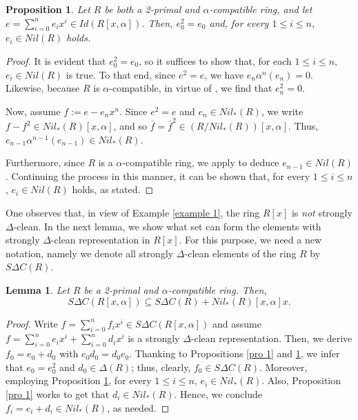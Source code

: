 \documentclass[12pt]{amsart}
\newtheorem{proposition}[theorem]{Proposition}
\newtheorem{lemma}[theorem]{Lemma}
\theoremstyle{definition}
\begin{document}
\begin{proposition}\label{pro 2}
Let \( R \) be both a 2-primal and \(\alpha\)-compatible ring, and let \(e = \sum_{i=0}^n e_i x^i \in Id(R[x, \alpha]) \). Then, \( e_0^2 = e_0 \) and, for every \( 1 \le i \le n \), \( e_i \in Nil(R) \) holds.
\end{proposition}

\begin{proof}
It is evident that \( e_0^2 = e_0 \), so it suffices to show that, for each \( 1 \le i \le n \), \( e_i \in Nil(R) \) is true. To that end, since \( e^2 = e \), we have \( e_n \alpha^n(e_n) = 0 \). Likewise, because \( R \) is \(\alpha\)-compatible, in virtue of \cite[Lemma 2.1]{hm}, we find that \( e_n^2 = 0 \).

Now, assume \( f := e - e_n x^n \). Since \( e^2 = e \) and \( e_n \in Nil_*(R) \), we write \( f - f^2 \in Nil_*(R)[x, \alpha] \), and so \(\bar{f} = \bar{f}^2 \in (R/Nil_*(R))[x, \alpha] \). Thus, \( e_{n-1} \alpha^{n-1}(e_{n-1}) \in Nil_*(R) \).

Furthermore, since \( R \) is a \(\alpha\)-compatible ring, we apply \cite[Lemma 2.1]{hm} to deduce \( e_{n-1} \in Nil(R) \). Continuing the process in this manner, it can be shown that, for every \( 1 \le i \le n \), \( e_i \in Nil(R) \) holds, as stated.
\end{proof}

One observes that, in view of Example \ref{example 1}, the ring $R[x]$ is {\it not} strongly $\Delta$-clean. In the next lemma, we show what set can form the elements with strongly $\Delta$-clean representation in $R[x]$. For this purpose, we need a new notation, namely we denote all strongly $\Delta$-clean elements of the ring $R$ by $S\Delta C(R)$.

\begin{lemma}
Let \( R \) be a 2-primal and \(\alpha\)-compatible ring. Then, \[ S\Delta C(R[x, \alpha]) \subseteq S\Delta C(R) + Nil_*(R)[x, \alpha]x .\]
\end{lemma}

\begin{proof}
Write \( f = \sum_{i=0}^n f_i x^i \in S\Delta C(R[x, \alpha]) \) and assume \( f = \sum_{i=0}^n e_i x^i + \sum_{i=0}^n d_i x^i \) is a strongly $\Delta$-clean representation. Then, we derive $f_0=e_0+d_0$ with $e_0d_0=d_0e_0$. Thanking to Propositions \ref{pro 1} and \ref{pro 2}, we infer that \( e_0 = e_0^2 \) and \( d_0 \in \Delta(R) \); thus, clearly, \( f_0 \in S\Delta C(R) \). Moreover, employing Proposition \ref{pro 2}, for every \( 1 \le i \le n \), \( e_i\in Nil_*(R) \). Also, Proposition \ref{pro 1} works to get that \( d_i\in Nil_*(R) \). Hence, we conclude \( f_i = e_i + d_i \in Nil_*(R) \), as needed.
\end{proof}
\end{document}
